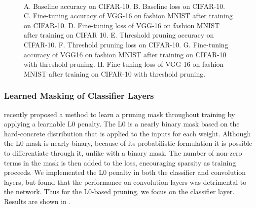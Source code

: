 \documentclass{article}
\begin{document}
\begin{figure}[!t]
{	}
	\\
	\caption{A. Baseline accuracy on CIFAR-10. B. Baseline loss on CIFAR-10.  C. Fine-tuning accuracy of VGG-16 on fashion MNIST after training on CIFAR-10. D. Fine-tuning loss of VGG-16 on fashion MNIST after training on CIFAR 10. E. Threshold pruning accuracy on CIFAR-10. F. Threshold pruning loss on CIFAR-10.  G. Fine-tuning accuracy of VGG16 on fashion MNIST after training on CIFAR-10 with threshold-pruning. H. Fine-tuning loss of VGG-16 on fashion MNIST after training on CIFAR-10 with threshold pruning.}
	\label{f1}
\end{figure}

\subsubsection{Learned Masking of Classifier Layers} \label{MaskClassL0}

\citet{L0norm} recently proposed a method to learn a pruning mask throughout training by applying a learnable L0 penalty. The L0 is a nearly binary mask based on the hard-concrete distribution that is applied to the inputs for each weight. Although the L0 mask is nearly binary, because of its probabilistic formulation it is possible to differentiate through it, unlike with a binary mask. The number of non-zero terms in the mask is then added to the loss, encouraging sparsity as training proceeds. We implemented the L0 penalty in both the classifier and convolution layers, but found that the performance on convolution layers was detrimental to the network. Thus for the L0-based pruning, we focus on the classifier layer. Results are shown in .
\end{document}
